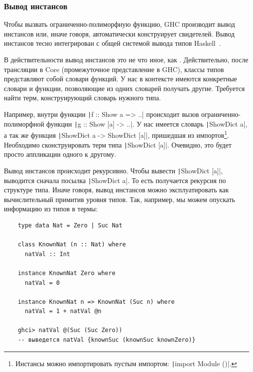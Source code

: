 \subsubsection{Вывод инстансов}

Чтобы вызвать ограниченно-полиморфную функцию, GHC производит вывод инстансов или, иначе говоря, автоматически конструирует свидетелей.
Вывод инстансов тесно интегрирован с общей системой вывода типов Haskell~\cite{spj-type-inference}.

В действительности вывод инстансов это не что иное, как .
Действительно, после трансляции в Core (промежуточное представление в GHC), классы типов представляют собой словари функций.
У нас в контексте имеются конкретные словари и функции, позволяющие из одних словарей получать другие.
Требуется найти терм, конструирующий словарь нужного типа.

Например, внутри функции \texttt|f :: Show a => ..| происходит вызов ограниченно- полиморфной функции
\texttt|g :: Show [a] -> ..|.
У нас имеется словарь \texttt|ShowDict a|, а так же функция \texttt|ShowDict a -> ShowDict [a]|, пришедшая из импортов\footnote{Инстансы можно импортировать пустым импортом: \texttt|import Module ()|.}.
Необходимо сконструировать терм типа \texttt|ShowDict [a]|.
Очевидно, это будет просто аппликации одного к другому.

Вывод инстансов происходит рекурсивно.
Чтобы вывести \texttt|ShowDict [a]|, выводится сначала посылка \texttt|ShowDict a|.
То есть получается рекурсия по структуре типа.
Иначе говоря, вывод инстансов можно эксплуатировать как вычислительный примитив уровня типов.
Так, например, мы можем опускать информацию из типов в термы:
\begin{verbatim}
    type data Nat = Zero | Suc Nat

    class KnownNat (n :: Nat) where
      natVal :: Int

    instance KnownNat Zero where
      natVal = 0

    instance KnownNat n => KnownNat (Suc n) where
      natVal = 1 + natVal @n

    ghci> natVal @(Suc (Suc Zero))
    -- выведется natVal {knownSuc (knownSuc knownZero)}
\end{verbatim}


